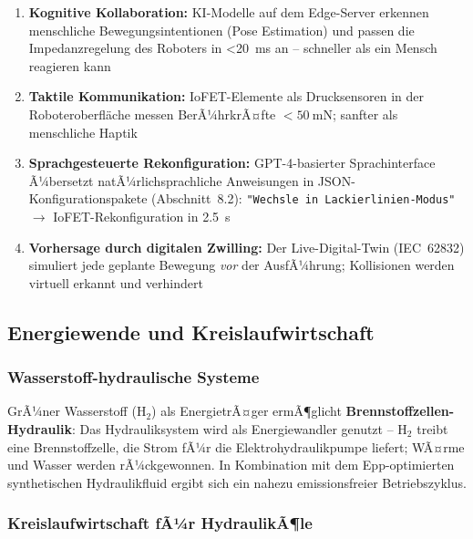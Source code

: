 ﻿\documentclass[a4paper,12pt]{scrreprt}
\theoremstyle{definition}
\begin{document}
\begin{enumerate}
  \item \textbf{Kognitive Kollaboration:} KI-Modelle auf dem Edge-Server
        erkennen menschliche Bewegungsintentionen (Pose Estimation) und
        passen die Impedanzregelung des Roboters in \SI{<20}{\milli\second}
        an -- schneller als ein Mensch reagieren kann
  \item \textbf{Taktile Kommunikation:} IoFET-Elemente als Drucksensoren
        in der Roboteroberfl\"{a}che messen BerÃ¼hrkrÃ¤fte $<\SI{50}{\milli\newton}$;
        sanfter als menschliche Haptik
  \item \textbf{Sprachgesteuerte Rekonfiguration:} GPT-4-basierter
        Sprachinterface Ã¼bersetzt natÃ¼rlichsprachliche Anweisungen
        in JSON-Konfigurationspakete (Abschnitt~8.2):
        \texttt{"Wechsle in Lackierlinien-Modus"} $\rightarrow$
        IoFET-Rekonfiguration in \SI{2.5}{\second}
  \item \textbf{Vorhersage durch digitalen Zwilling:} Der Live-Digital-Twin
        (IEC~62832) simuliert jede geplante Bewegung \emph{vor}
        der AusfÃ¼hrung; Kollisionen werden virtuell erkannt
        und verhindert
\end{enumerate}

\subsection{Energiewende und Kreislaufwirtschaft}

\subsubsection{Wasserstoff-hydraulische Systeme}

GrÃ¼ner Wasserstoff ($\mathrm{H_2}$) als EnergietrÃ¤ger ermÃ¶glicht
\textbf{Brennstoffzellen-Hydraulik}: Das Hydrauliksystem wird als
Energiewandler genutzt -- $\mathrm{H_2}$ treibt eine Brennstoffzelle,
die Strom fÃ¼r die Elektrohydraulikpumpe liefert; WÃ¤rme und Wasser
werden rÃ¼ckgewonnen. In Kombination mit dem Epp-optimierten
synthetischen Hydraulikfluid ergibt sich ein nahezu emissionsfreier
Betriebszyklus.

\subsubsection{Kreislaufwirtschaft fÃ¼r HydraulikÃ¶le}
\end{document}
